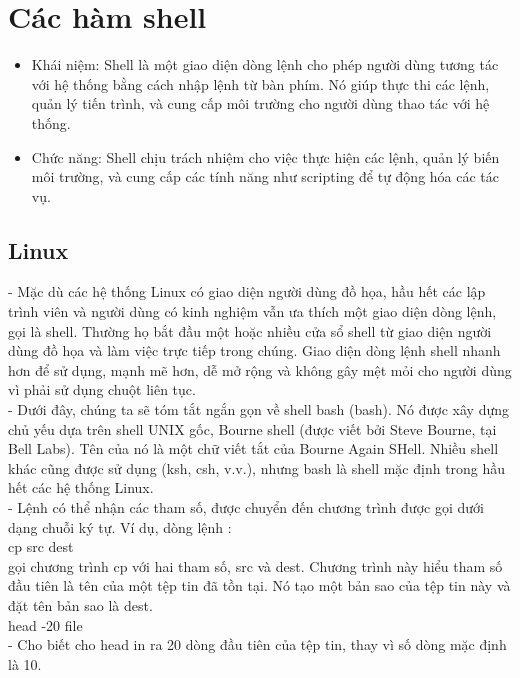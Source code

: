 \documentclass[12pt,a4paper]{article}
\begin{document}
\section{Các hàm shell}
\begin{itemize}
	\item Khái niệm: Shell là một giao diện dòng lệnh cho phép người dùng tương tác với hệ thống bằng cách nhập lệnh từ bàn phím. Nó giúp thực thi các lệnh, quản lý tiến trình, và cung cấp môi trường cho người dùng thao tác với hệ thống.
	\item Chức năng: Shell chịu trách nhiệm cho việc thực hiện các lệnh, quản lý biến môi trường, và cung cấp các tính năng như scripting để tự động hóa các tác vụ. 
\end{itemize}
\subsection{Linux}
- Mặc dù các hệ thống Linux có giao diện người dùng đồ họa, hầu hết các lập trình viên và người dùng có kinh nghiệm vẫn ưa thích một giao diện dòng lệnh, gọi là shell. Thường họ bắt đầu một hoặc nhiều cửa sổ shell từ giao diện người dùng đồ họa và làm việc trực tiếp trong chúng. Giao diện dòng lệnh shell nhanh hơn để sử dụng, mạnh mẽ hơn, dễ mở rộng và không gây mệt mỏi cho người dùng vì phải sử dụng chuột liên tục.\\

- Dưới đây, chúng ta sẽ tóm tắt ngắn gọn về shell bash (bash). Nó được xây dựng chủ yếu dựa trên shell UNIX gốc, Bourne shell (được viết bởi Steve Bourne, tại Bell Labs). Tên của nó là một chữ viết tắt của Bourne Again SHell. Nhiều shell khác cũng được sử dụng (ksh, csh, v.v.), nhưng bash là shell mặc định trong hầu hết các hệ thống Linux.\\

- Lệnh có thể nhận các tham số, được chuyển đến chương trình được gọi dưới dạng chuỗi ký tự. Ví dụ, dòng lệnh  :\\

cp src dest\\

gọi chương trình cp với hai tham số, src và dest. Chương trình này hiểu tham số đầu tiên là tên của một tệp tin đã tồn tại. Nó tạo một bản sao của tệp tin này và đặt tên bản sao là dest.\\

head -20 file\\

- Cho biết cho head in ra 20 dòng đầu tiên của tệp tin, thay vì số dòng mặc định là 10.\\
\end{document}

